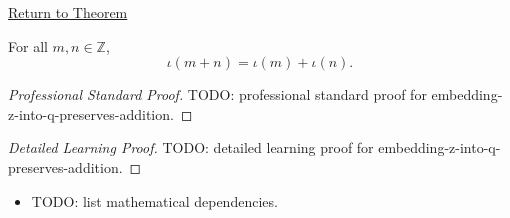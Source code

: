 \newpage
{}
\label{prf:embedding-z-into-q-preserves-addition}

\begin{remark*}[Return]
\hyperref[thm:embedding-z-into-q-preserves-addition]{Return to Theorem}
\end{remark*}

\begin{theorem*}
For all $m,n\in\mathbb{Z}$,
\[
\iota(m+n)=\iota(m)+\iota(n).
\]
\end{theorem*}

\begin{proof}[Professional Standard Proof]
\LRAProofBodyStart
TODO: professional standard proof for embedding-z-into-q-preserves-addition.
\end{proof}

\begin{proof}[Detailed Learning Proof]
\LRAProofBodyStart
TODO: detailed learning proof for embedding-z-into-q-preserves-addition.
\end{proof}

\begin{remark*}
\end{remark*}

\begin{dependencies}
\begin{itemize}
  \item TODO: list mathematical dependencies.
\end{itemize}
\end{dependencies}

\clearpage
